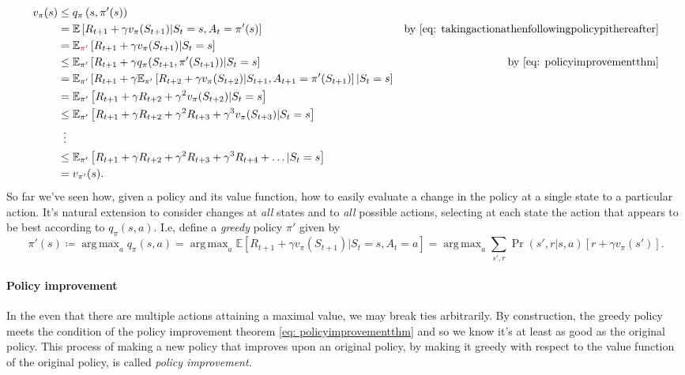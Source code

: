 \documentclass[12pt]{article}
\DeclareMathOperator*{\argmax}{arg\,max}
\begin{document}
\begin{align*}
  v_\pi(s) &\leq q_\pi\left(s, \pi'(s)\right) \\
          &= \mathbb E \left[R_{t+1} + \gamma v_\pi(S_{t+1}) | S_t = s, A_t = \pi'(s)\right] &\textrm{by \ref{eq: takingactionathenfollowingpolicypithereafter}}  \\
           &= \mathbb E_{\color{purple}\pi'} \left[R_{t+1} + \gamma              v_\pi(S_{t+1}) | S_t = s \right] \\
          &\leq \mathbb E_{\pi'} \left[R_{t+1} + \gamma q_\pi(S_{t+1},             \pi'(S_{t+1})) | S_t = s\right] &\textrm{by \ref{eq: policyimprovementthm}} \\
           &= \mathbb E_{\pi'} \left[R_{t+1} + \gamma \mathbb E_{\pi'} \left[R_{t+2} + \gamma v_\pi(S_{t+2}) | S_{t+1}, A_{t+1} = \pi'(S_{t+1})\right]              | S_t = s \right] \\
           &= \mathbb E_{\pi'} \left[R_{t+1} + \gamma R_{t+2} + \gamma^2              v_\pi(S_{t+2}) | S_t = s \right] \\
           &\leq \mathbb E_{\pi'} \left[R_{t+1} + \gamma R_{t+2} + \gamma^2              R_{t+3} + \gamma^3 v_\pi(S_{t+3}) | S_t = s \right] \\
           &\hspace{5pt} \vdots \\
           &\leq \mathbb E_{\pi'} \left[R_{t+1} + \gamma R_{t+2} + \gamma^2              R_{t+3} + \gamma^3 R_{t+4} + \ldots | S_t = s \right] \\
           &= v_{\pi'}(s).
\end{align*}
So far we've seen how, given a policy and its value function, how to easily evaluate a change in the policy at a single state to a particular action. It's natural extension to consider changes at \emph{all} states and to \emph{all} possible actions, selecting at each state the action that appears to be best according to $q_\pi(s,a)$. I.e, define a \emph{greedy} policy $\pi'$ given by
\begin{equation}
  \label{eq: greedypolicy}
  \pi'(s) \coloneqq \argmax_a q_\pi(s,a) = \argmax_a \mathbb E \left[R_{t+1} + \gamma v_\pi(S_{t+1}) | S_t = s, A_t = a \right] = \argmax_a \sum_{s',r} \Pr(s',r|s,a) \left[ r + \gamma v_\pi(s')\right].
\end{equation}
\paragraph{Policy improvement}
In the even that there are multiple actions attaining a maximal value, we may break ties arbitrarily. By construction, the greedy policy meets the condition of the policy improvement theorem \ref{eq: policyimprovementthm} and so we know it's at least as good as the original policy. This process of making a new policy that improves upon an original policy, by making it greedy with respect  to the value function of the original policy, is called \emph{policy   improvement}.
\end{document}
